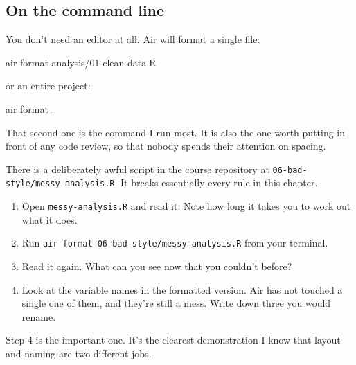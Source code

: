 \documentclass[
  letterpaper,
  justified,
  a4paper]{tufte-book}
\makeatletter
\newenvironment{Shaded}{\begin{snugshade}}{\end{snugshade}}
\newcommand{\ExtensionTok}[1]{\textcolor[rgb]{0.00,0.23,0.31}{#1}}
\newcommand{\NormalTok}[1]{\textcolor[rgb]{0.00,0.23,0.31}{#1}}
\providecommand{\tightlist}{%
  \setlength{\itemsep}{0pt}\setlength{\parskip}{0pt}}
\providecommand{\tightlist}{%
  \setlength{\itemsep}{0pt}\setlength{\parskip}{0pt}}
\let\rbporigShaded\Shaded
\let\rbporigendShaded\endShaded
\renewenvironment{Shaded}{%
  \begingroup
  \ifdim\linewidth=\rbpbodywidth
    \advance\linewidth by \@tufte@overhang
    \advance\hsize by \@tufte@overhang
    \advance\columnwidth by \@tufte@overhang
  \fi
  \rbporigShaded
}{%
  \rbporigendShaded
  \endgroup
}
\makeatother
\begin{document}
\subsection{On the command line}\label{on-the-command-line}

You don't need an editor at all. Air will format a single file:

\begin{Shaded}
\begin{Highlighting}[]
\ExtensionTok{air}\NormalTok{ format analysis/01{-}clean{-}data.R}
\end{Highlighting}
\end{Shaded}

or an entire project:

\begin{Shaded}
\begin{Highlighting}[]
\ExtensionTok{air}\NormalTok{ format .}
\end{Highlighting}
\end{Shaded}

That second one is the command I run most. It is also the one worth
putting in front of any code review, so that nobody spends their
attention on spacing.

\begin{tcolorbox}[enhanced jigsaw, arc=.35mm, bottomrule=.15mm, bottomtitle=1mm, breakable, colback=white, colbacktitle=quarto-callout-note-color!10!white, colframe=quarto-callout-note-color-frame, coltitle=black, left=2mm, leftrule=.75mm, opacityback=0, opacitybacktitle=0.6, rightrule=.15mm, title=\textcolor{quarto-callout-note-color}{\faInfo}\hspace{0.5em}{Your Turn}, titlerule=0mm, toprule=.15mm, toptitle=1mm]

There is a deliberately awful script in the course repository at
\texttt{06-bad-style/messy-analysis.R}. It breaks essentially every rule
in this chapter.

\begin{enumerate}
\def\labelenumi{\arabic{enumi}.}
\tightlist
\item
  Open \texttt{messy-analysis.R} and read it. Note how long it takes you
  to work out what it does.
\item
  Run \texttt{air\ format\ 06-bad-style/messy-analysis.R} from your
  terminal.
\item
  Read it again. What can you see now that you couldn't before?
\item
  Look at the variable names in the formatted version. Air has not
  touched a single one of them, and they're still a mess. Write down
  three you would rename.
\end{enumerate}

Step 4 is the important one. It's the clearest demonstration I know that
layout and naming are two different jobs.

\end{tcolorbox}
\end{document}
